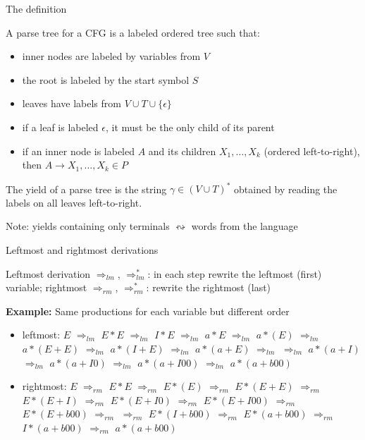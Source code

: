 \documentclass[handout]{beamer}
\begin{document}
\begin{frame}{The definition}

	A \alert{parse tree} for a CFG is a labeled ordered tree such that:
	\begin{itemize}
		\item inner nodes are labeled by variables from $V$
		\item the root is labeled by the start symbol $S$
		\item leaves have labels from $V \cup T \cup \{\epsilon\}$
		\item if a leaf is labeled $\epsilon$, it must be the only child of its parent
		\item if an inner node is labeled $A$ and its children $X_1,\dots,X_k$ (ordered left-to-right), then $A\rightarrow X_1,\dots,X_k \in P $
	\end{itemize}

	The \alert{yield} of a parse tree is the string $\gamma\in(V\cup T)^*$ obtained by reading the labels on all leaves left-to-right.
	
	\medskip

	Note: yields containing only terminals $\leftrightsquigarrow$ words from the language

\end{frame}


\begin{frame}{Leftmost and rightmost derivations}

	\alert{Leftmost derivation $\Rightarrow_{lm}$, $\Rightarrow_{lm}^*$}: in each step rewrite the leftmost (first) variable; \alert{rightmost $\Rightarrow_{rm}$, $\Rightarrow_{rm}^*$}: rewrite the rightmost (last)

	\bigskip

	\textbf{Example:} Same productions for each variable but different order

	\begin{itemize}
		\item \alert{leftmost:} $E$ $\Rightarrow_{lm}$ $E*E$ $\Rightarrow_{lm}$ $I*E$ $\Rightarrow_{lm}$ $a*E$ $\Rightarrow_{lm}$ $a*(E)$ $\Rightarrow_{lm}$ $a *(E+E)$ $\Rightarrow_{lm}$ $a*(I+E)$ $\Rightarrow_{lm}$ $a*(a+E)$ $\Rightarrow_{lm}$
		$\Rightarrow_{lm}$ $a*(a+I)$ $\Rightarrow_{lm}$ $a*(a+I0)$ $\Rightarrow_{lm}$ $a*(a+I00)$ $\Rightarrow_{lm}$ \alert{$a*(a+b00)$}
		\item \alert{rightmost:} $E$ $\Rightarrow_{rm}$ $E*E$ $\Rightarrow_{rm}$ $E*(E)$ $\Rightarrow_{rm}$ $E*(E+E)$ $\Rightarrow_{rm}$ $E*(E+I)$ $\Rightarrow_{rm}$ $E*(E+I0)$
		$\Rightarrow_{rm}$ $E*(E+I00)$ $\Rightarrow_{rm}$ $E*(E+b00)$ $\Rightarrow_{rm}$ $\Rightarrow_{rm}$ $E*(I+b00)$ $\Rightarrow_{rm}$ $E*(a+b00)$ $\Rightarrow_{rm}$ $I*(a+b00)$ $\Rightarrow_{rm}$ \alert{$a*(a+b00)$}
	\end{itemize}

\end{frame}
\end{document}
